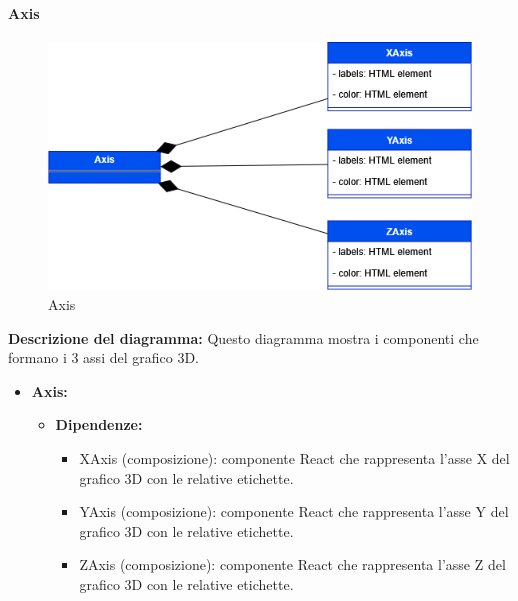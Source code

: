 \paragraph{Axis}
\begin{figure}[h!] \centering
    \includegraphics[scale=0.45]{template/images/uml_front/ui/axis.png}
    \caption{Axis}
\end{figure}
\textbf{Descrizione del diagramma:}
Questo diagramma mostra i componenti che formano i 3 assi del grafico 3D.
\begin{itemize}
    \item \textbf{Axis:}
    \begin{itemize}
        \item \textbf{Dipendenze:}
        \begin{itemize}
            \item XAxis (composizione): componente React che rappresenta l'asse X del grafico 3D con le relative etichette.
            \item YAxis (composizione): componente React che rappresenta l'asse Y del grafico 3D con le relative etichette.
            \item ZAxis (composizione): componente React che rappresenta l'asse Z del grafico 3D con le relative etichette.
        \end{itemize} 
    \end{itemize}
\end{itemize}




